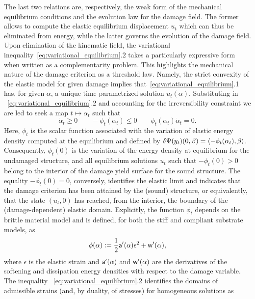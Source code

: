 The last two relations are, respectively, the weak form of the mechanical equilibrium conditions and the  evolution law  for the damage field.
The former allows to compute the elastic equilibrium displacement $u_t$ which can thus be eliminated from energy, while the latter governs the evolution of the damage field.
Upon elimination of the kinematic field, the variational inequality~\eqref{eq:variational_equilibrium}.2 takes a particularly expressive form when written as a complementarity problem. This highlights the mechanical nature of the damage criterion as a threshold law.
Namely, the strict convexity of the elastic model for given damage implies that~\eqref{eq:variational_equilibrium}.1 has, for given $\alpha$, a unique time-parametrized solution $u_t(\alpha)$.
Substituting in ~\eqref{eq:variational_equilibrium}.2 and accounting for the irreversibility constraint we are led to seek a map $t\mapsto\alpha_t$ such that
\begin{equation}
    \label{eq:complementarity}
    \dot \alpha_t \geq 0 \qquad
    -\phi_t(\alpha_t) \leq 0 \qquad
    \phi_t(\alpha_t)\dot \alpha_t = 0.
\end{equation}
Here, $\phi_t$ is the scalar function associated with  the variation of elastic energy density {computed} at the equilibrium {and} defined by $\delta \Psi(y_t)(0, \beta) = \langle -\phi_t(\alpha_t), \beta\rangle$.
Consequently, $\phi_t(0)$ is
the variation of the  energy density at equilibrium for the undamaged structure, and all equilibrium solutions $u_t$ such that $-\phi_t(0) > 0$ belong to the interior of the damage yield surface for the sound structure. The equality $-\phi_t(0) = 0$, conversely, identifies the elastic limit and indicates that the damage criterion has been attained by the (sound) structure, or equivalently, that the state $(u_t, 0)$ has reached, from the interior, the boundary of the (damage-dependent) elastic domain.
% 
% 
% 
Explicitly, the function $\phi_t$ depends on the brittle material model and is defined, for both the stiff and compliant substrate models, as
\begin{equation}
    \label{eq:energy_release_rate}
    \phi(\alpha) := \frac{1}{2}\mathsf{a}'(\alpha)\epsilon^2 + \mathsf{w}'(\alpha),
\end{equation}
where $\epsilon$ is the elastic strain and $\mathsf{a}'(\alpha)$ and $\mathsf{w}'(\alpha)$ are the derivatives of the softening and dissipation energy densities with respect to the damage variable.
The inequality ~\eqref{eq:variational_equilibrium}.2 identifies the domains of admissible strains (and, by duality, of stresses) for homogeneous solutions as
